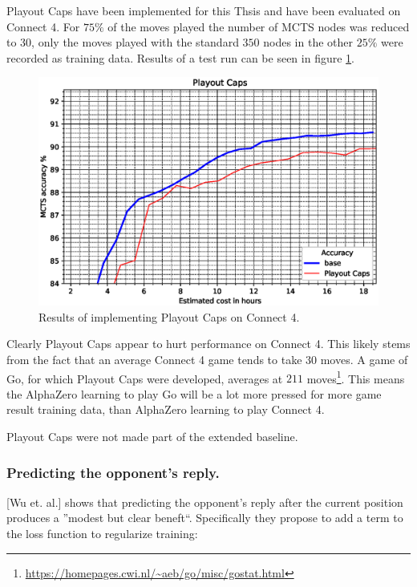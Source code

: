 \documentclass[12pt,onecolumn,oneside,titlepage]{article}
\begin{document}
Playout Caps have been implemented for this Thsis and have been evaluated on Connect 4. For $75\%$ of the moves played the number of MCTS nodes was reduced to $30$, only the moves played with the standard $350$ nodes in the other $25\%$ were recorded as training data.
Results of a test run can be seen in figure \ref{fig:playout_caps}.

\begin{figure}[H]
\centering
\includegraphics[clip,width=\columnwidth]{playout_caps}
\caption{Results of implementing Playout Caps on Connect 4.}
\label{fig:playout_caps}
\end{figure}

Clearly Playout Caps appear to hurt performance on Connect 4. This likely stems from the fact that an average Connect 4 game tends to take $30$ moves. A game of Go, for which Playout Caps were developed, averages at $211$ moves\footnote{\url{https://homepages.cwi.nl/~aeb/go/misc/gostat.html}}.
This means the AlphaZero learning to play Go will be a lot more pressed for more game result training data, than AlphaZero learning to play Connect 4.

Playout Caps were not made part of the extended baseline.

\subsubsection{Predicting the opponent's reply.}

\cite{wu2019accelerating}[Wu et. al.] shows that predicting the opponent's reply after the current position produces a ''modest but clear beneft``.
Specifically they propose to add a term to the loss function to regularize training:
\end{document}
